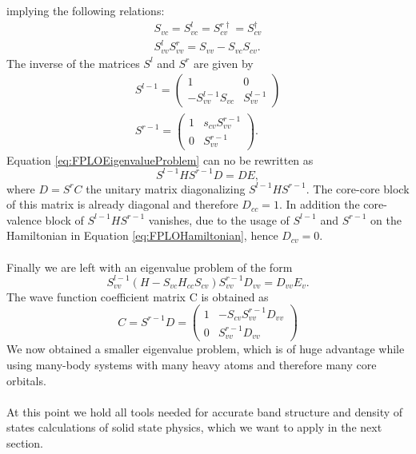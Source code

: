			implying the following relations:
			\begin{align}
				S_{vc} = S_{vc}^l = S_{cv}^{r \dag } = S_{cv}^{\dag} \\
				S_{vv}^l S_{vv}^r = S_{vv} - S_{vc} S_{cv}. 
			\end{align}
			The inverse of the matrices $S^l$ and $S^r$ are given by 
			\begin{align}
				S^{l-1} = 
				\begin{pmatrix}
					1 & 0 \\
					- S_{vv}^{l-1} S_{vc} & S_{vv}^{l-1}
				\end{pmatrix} \\			
				S^{r-1} = 
				\begin{pmatrix}
					1 & s_{cv}S_{vv}^{r-1} \\
					0 & S_{vv}^{r-1}
				\end{pmatrix}.
			\end{align}
			Equation \ref{eq:FPLOEigenvalueProblem} can no be rewritten as 
			\begin{equation}
				S^{l-1} H S^{r-1} D = DE,
			\end{equation}
			where $D = S^r C$ the unitary matrix diagonalizing $S^{l-1} H S^{r-1}$. The core-core block of this matrix is already diagonal and therefore $D_{cc} = 1$. In addition the core-valence block of $S^{l-1} H S^{r-1}$ vanishes, due to the usage of $S^{l-1}$ and $S^{r-1}$ on the Hamiltonian in Equation \ref{eq:FPLOHamiltonian}, hence $D_{cv} = 0$. \\\\
			Finally we are left with an eigenvalue problem of the form
			\begin{equation}
				S_{vv}^{l-1} (H - S_{vc} H_{cc} S_{cv} ) S_{vv}^{r-1} D_{vv} = D_{vv} E_v.
			\end{equation}
			The wave function coefficient matrix C is obtained as
			\begin{equation}
				C = S^{r-1} D = 
				\begin{pmatrix}
					 1 & -S_{cv} S_{vv}^{r-1} D_{vv} \\
					 0 & S_{vv}^{r-1} D_{vv}
				\end{pmatrix}
			\end{equation}
			We now obtained a smaller eigenvalue problem, which is of huge advantage while using many-body systems with many heavy atoms and therefore many core orbitals. \\\\
			At this point we hold all tools needed for accurate band structure and density of states calculations of solid state physics, which we want to apply in the next section.
			
